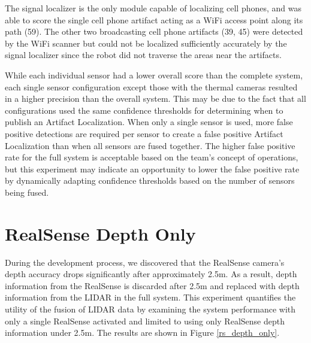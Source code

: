 The signal localizer is the only module capable of localizing cell phones, and was able to score the single cell phone artifact acting as a WiFi access point along its path (59). The other two broadcasting cell phone artifacts (39, 45) were detected by the WiFi scanner but could not be localized sufficiently accurately by the signal localizer since the robot did not traverse the areas near the artifacts.

While each individual sensor had a lower overall score than the complete system, each single sensor configuration except those with the thermal cameras resulted in a higher precision than the overall system. This may be due to the fact that all configurations used the same confidence thresholds for determining when to publish an Artifact Localization. When only a single sensor is used, more false positive detections are required per sensor to create a false positive Artifact Localization than when all sensors are fused together. The higher false positive rate for the full system is acceptable based on the team's concept of operations, but this experiment may indicate an opportunity to lower the false positive rate by dynamically adapting confidence thresholds based on the number of sensors being fused.

\section{RealSense Depth Only}

During the development process, we discovered that the RealSense camera's depth accuracy drops significantly after approximately 2.5m. As a result, depth information from the RealSense is discarded after 2.5m and replaced with depth information from the LIDAR in the full system. This experiment quantifies the utility of the fusion of LIDAR data by examining the system performance with only a single RealSense activated and limited to using only RealSense depth information under 2.5m. The results are shown in Figure \ref{rs_depth_only}.


